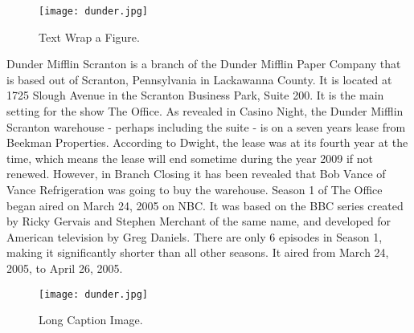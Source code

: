 \documentclass[12pt, oneside]{article}   	%
\begin{document}
\newpage
\begin{wrapfigure}{r}{0.5\textwidth}
  \begin{center}
    \texttt{[image: dunder.jpg]}
  \end{center}
  \caption{Text Wrap a Figure. }
\end{wrapfigure}
Dunder Mifflin Scranton is a branch of the Dunder Mifflin Paper Company that is based out of Scranton, Pennsylvania in Lackawanna County. It is located at 1725 Slough Avenue in the Scranton Business Park, Suite 200. It is the main setting for the show The Office. As revealed in Casino Night, the Dunder Mifflin Scranton warehouse - perhaps including the suite - is on a seven years lease from Beekman Properties. According to Dwight, the lease was at its fourth year at the time, which means the lease will end sometime during the year 2009 if not renewed. However, in Branch Closing it has been revealed that Bob Vance of Vance Refrigeration was going to buy the warehouse.
Season 1 of The Office began aired on March 24, 2005 on NBC. It was based on the BBC series created by Ricky Gervais and Stephen Merchant of the same name, and developed for American television by Greg Daniels.
There are only 6 episodes in Season 1, making it significantly shorter than all other seasons. It aired from March 24, 2005, to April 26, 2005.


\newpage
\begin{SCfigure}
  \centering
  \caption{Long Caption Image.}
  \texttt{[image: dunder.jpg]}%
\end{SCfigure}
\end{document}
